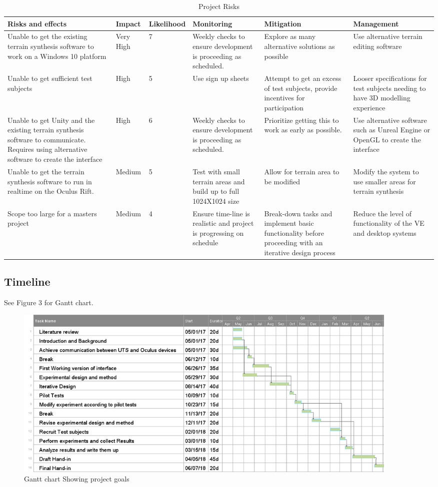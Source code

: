 \documentclass{sig-alternate-05-2015}
\begin{document}
\begin{table}[t]
	\centering
	\begin{tabular}{m{4cm} |m{1.75cm} |m{1.5cm} |m{3cm} |m{3cm} |m{3cm} }
		Risks and effects & Impact & Likelihood & Monitoring & Mitigation & Management \\ \hline
		Unable to get the existing terrain synthesis software to work on a Windows 10 platform & Very High & 7 & Weekly checks to ensure development is proceeding as scheduled. & Explore as many alternative solutions as possible & Use alternative terrain editing software\\ \hline
		Unable to get sufficient test subjects&
		High&
		5&
		Use sign up sheets&
		Attempt to get an excess of test subjects, provide incentives for participation&
		Looser specifications for test subjects needing to have 3D modelling experience\\ \hline
		Unable to get Unity and the existing terrain synthesis software to communicate. Requires using alternative software to create the interface & High & 6 & Weekly checks to ensure development is proceeding as scheduled. & Prioritize getting this to work as early as possible. & Use alternative software such as Unreal Engine or OpenGL to create the interface\\ \hline
		Unable to get the terrain synthesis software to run in realtime on the Oculus Rift. &
		Medium&
		5&
		Test with small terrain areas and build up to full 1024X1024 size&
		Allow for terrain area to be modified&
		Modify the system to use smaller areas for terrain synthesis\\ \hline
		Scope too large for a masters project&
		Medium&
		4&
		Ensure time-line is realistic and project is progressing on schedule&
		Break-down tasks and implement basic functionality before proceeding with an iterative design process&
		Reduce the level of functionality of the VE and desktop systems
	\end{tabular}
	\caption{Project Risks}
\end{table}
\subsection{Timeline}
See Figure 3 for Gantt chart.
\begin{figure}[t]
	\includegraphics[width=540pt]{Gantt}
	\caption{Gantt chart Showing project goals}
\end{figure}
\end{document}

